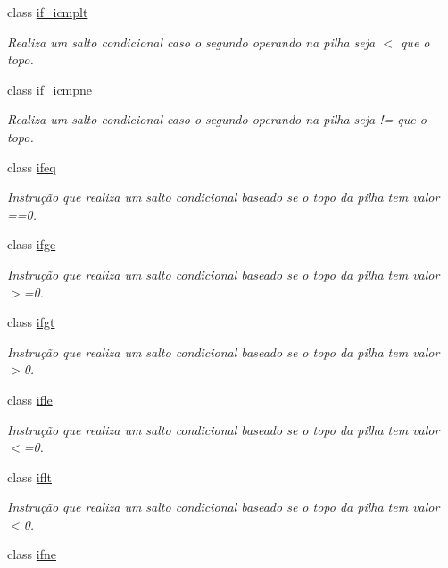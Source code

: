 \begin{DoxyCompactItemize}
class \hyperlink{class_instruction_impl_1_1if__icmplt}{if\+\_\+icmplt}
\begin{DoxyCompactList}\small\item\em Realiza um salto condicional caso o segundo operando na pilha seja $<$ que o topo. \end{DoxyCompactList}\item 
class \hyperlink{class_instruction_impl_1_1if__icmpne}{if\+\_\+icmpne}
\begin{DoxyCompactList}\small\item\em Realiza um salto condicional caso o segundo operando na pilha seja != que o topo. \end{DoxyCompactList}\item 
class \hyperlink{class_instruction_impl_1_1ifeq}{ifeq}
\begin{DoxyCompactList}\small\item\em Instrução que realiza um salto condicional baseado se o topo da pilha tem valor ==0. \end{DoxyCompactList}\item 
class \hyperlink{class_instruction_impl_1_1ifge}{ifge}
\begin{DoxyCompactList}\small\item\em Instrução que realiza um salto condicional baseado se o topo da pilha tem valor $>$=0. \end{DoxyCompactList}\item 
class \hyperlink{class_instruction_impl_1_1ifgt}{ifgt}
\begin{DoxyCompactList}\small\item\em Instrução que realiza um salto condicional baseado se o topo da pilha tem valor $>$0. \end{DoxyCompactList}\item 
class \hyperlink{class_instruction_impl_1_1ifle}{ifle}
\begin{DoxyCompactList}\small\item\em Instrução que realiza um salto condicional baseado se o topo da pilha tem valor $<$=0. \end{DoxyCompactList}\item 
class \hyperlink{class_instruction_impl_1_1iflt}{iflt}
\begin{DoxyCompactList}\small\item\em Instrução que realiza um salto condicional baseado se o topo da pilha tem valor $<$0. \end{DoxyCompactList}\item 
class \hyperlink{class_instruction_impl_1_1ifne}{ifne}

\end{DoxyCompactItemize}
